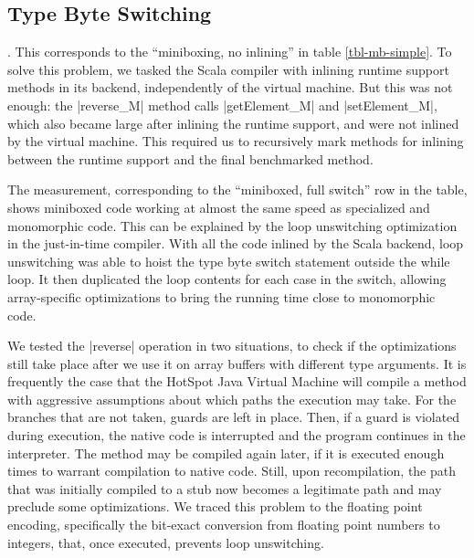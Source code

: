 \subsection{Type Byte Switching}
\label{subsec-mb-switching}

. This corresponds to the ``miniboxing, no inlining'' in table \ref{tbl-mb-simple}. To solve this problem, we tasked the Scala compiler with inlining runtime support methods in its backend, independently of the virtual machine. But this was not enough: the |reverse_M| method calls |getElement_M| and |setElement_M|, which also became large after inlining the runtime support, and were not inlined by the virtual machine. This required us to recursively mark methods for inlining between the runtime support and the final benchmarked method.

 The measurement, corresponding to the ``miniboxed, full switch'' row in the table, shows miniboxed code working at almost the same speed as specialized and monomorphic code. This can be explained by the  loop unswitching optimization in the just-in-time compiler. With all the code inlined by the Scala backend, loop unswitching was able to hoist the type byte switch statement outside the while loop. It then duplicated the loop contents for each case in the switch, allowing array-specific optimizations to bring the running time close to monomorphic code.

 We tested the |reverse| operation in two situations, to check if the optimizations still take place after we use it on array buffers with different type arguments. It is frequently the case that the HotSpot Java Virtual Machine will compile a method with aggressive assumptions about which paths the execution may take. For the branches that are not taken, guards are left in place. Then, if a guard is violated during execution, the native code is interrupted and the program continues in the interpreter. The method may be compiled again later, if it is executed enough times to warrant compilation to native code. Still, upon recompilation, the path that was initially compiled to a stub now becomes a legitimate path and may preclude some optimizations. We traced this problem to the floating point encoding, specifically the bit-exact conversion from floating point numbers to integers, that, once executed, prevents loop unswitching.     

